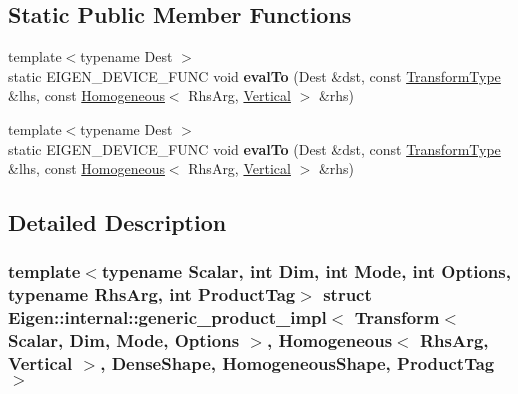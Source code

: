 \subsection*{Static Public Member Functions}
\begin{DoxyCompactItemize}
\item 
\mbox{\label{struct_eigen_1_1internal_1_1generic__product__impl_3_01_transform_3_01_scalar_00_01_dim_00_01_mo9dee7991850e2cedf8646fca36129af2_ac033f7d219536619cb43eb53bbae04a4}} 
{\footnotesize template$<$typename Dest $>$ }\\static E\+I\+G\+E\+N\+\_\+\+D\+E\+V\+I\+C\+E\+\_\+\+F\+U\+NC void {\bfseries eval\+To} (Dest \&dst, const \hyperlink{group___geometry___module_class_eigen_1_1_transform}{Transform\+Type} \&lhs, const \hyperlink{group___geometry___module_class_eigen_1_1_homogeneous}{Homogeneous}$<$ Rhs\+Arg, \hyperlink{group__enums_ggad49a7b3738e273eb00932271b36127f7addca718e0564723df21d61b94b1198be}{Vertical} $>$ \&rhs)
\item 
\mbox{\label{struct_eigen_1_1internal_1_1generic__product__impl_3_01_transform_3_01_scalar_00_01_dim_00_01_mo9dee7991850e2cedf8646fca36129af2_ac033f7d219536619cb43eb53bbae04a4}} 
{\footnotesize template$<$typename Dest $>$ }\\static E\+I\+G\+E\+N\+\_\+\+D\+E\+V\+I\+C\+E\+\_\+\+F\+U\+NC void {\bfseries eval\+To} (Dest \&dst, const \hyperlink{group___geometry___module_class_eigen_1_1_transform}{Transform\+Type} \&lhs, const \hyperlink{group___geometry___module_class_eigen_1_1_homogeneous}{Homogeneous}$<$ Rhs\+Arg, \hyperlink{group__enums_ggad49a7b3738e273eb00932271b36127f7addca718e0564723df21d61b94b1198be}{Vertical} $>$ \&rhs)
\end{DoxyCompactItemize}


\subsection{Detailed Description}
\subsubsection*{template$<$typename Scalar, int Dim, int Mode, int Options, typename Rhs\+Arg, int Product\+Tag$>$\newline
struct Eigen\+::internal\+::generic\+\_\+product\+\_\+impl$<$ Transform$<$ Scalar, Dim, Mode, Options $>$, Homogeneous$<$ Rhs\+Arg, Vertical $>$, Dense\+Shape, Homogeneous\+Shape, Product\+Tag $>$}



